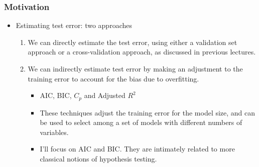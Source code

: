 \documentclass[
  shownotes,
  xcolor={svgnames},
  hyperref={colorlinks,citecolor=DarkBlue,linkcolor=DarkRed,urlcolor=DarkBlue}
  ]{beamer}
\begin{document}
\begin{frame}[fragile]
\frametitle{Motivation}
\begin{itemize}
\item Estimating test error: two approaches
\medskip
\begin{enumerate}
\item We can directly estimate the test error, using either a validation set approach or a cross-validation approach, as discussed in previous lectures.
\medskip
\item We can indirectly estimate test error by making an adjustment to the training error to account for the bias due to overfitting.
\medskip
\begin{itemize}
  \item AIC, BIC, $C_p$ and Adjusted $R^2$
  \medskip
  \item These techniques adjust the training error for the model size, and can be used to select among a set of models with different numbers of variables.
  \medskip
  \item I'll focus on AIC and BIC. They are intimately related to  more classical notions of hypothesis testing. 
\end{itemize}


\end{enumerate}
\end{itemize}

\end{frame}
\end{document}
